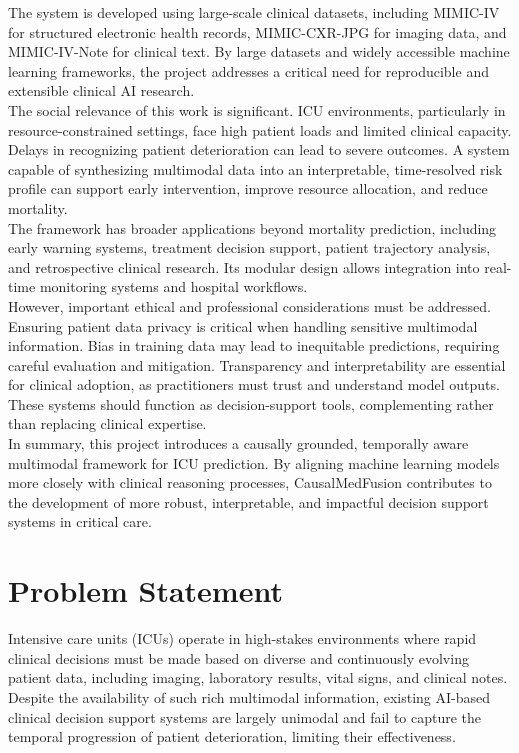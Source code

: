 \documentclass{fisatprojectfinal}
\begin{document}
The system is developed using large-scale clinical datasets, including MIMIC-IV for structured electronic health records, MIMIC-CXR-JPG for imaging data, and MIMIC-IV-Note for clinical text. By large datasets and widely accessible machine learning frameworks, the project addresses a critical need for reproducible and extensible clinical AI research. \\

The social relevance of this work is significant. ICU environments, particularly in resource-constrained settings, face high patient loads and limited clinical capacity. Delays in recognizing patient deterioration can lead to severe outcomes. A system capable of synthesizing multimodal data into an interpretable, time-resolved risk profile can support early intervention, improve resource allocation, and reduce mortality.  \\

The framework has broader applications beyond mortality prediction, including early warning systems, treatment decision support, patient trajectory analysis, and retrospective clinical research. Its modular design allows integration into real-time monitoring systems and hospital workflows.\\

However, important ethical and professional considerations must be addressed. Ensuring patient data privacy is critical when handling sensitive multimodal information. Bias in training data may lead to inequitable predictions, requiring careful evaluation and mitigation. Transparency and interpretability are essential for clinical adoption, as practitioners must trust and understand model outputs. These systems should function as decision-support tools, complementing rather than replacing clinical expertise.\\

In summary, this project introduces a causally grounded, temporally aware multimodal framework for ICU prediction. By aligning machine learning models more closely with clinical reasoning processes, CausalMedFusion contributes to the development of more robust, interpretable, and impactful decision support systems in critical care. 

\section{Problem Statement}
Intensive care units (ICUs) operate in high-stakes environments where rapid clinical decisions must be made based on diverse and continuously evolving patient data, including imaging, laboratory results, vital signs, and clinical notes. Despite the availability of such rich multimodal information, existing AI-based clinical decision support systems are largely unimodal and fail to capture the temporal progression of patient deterioration, limiting their effectiveness.\\
\end{document}
